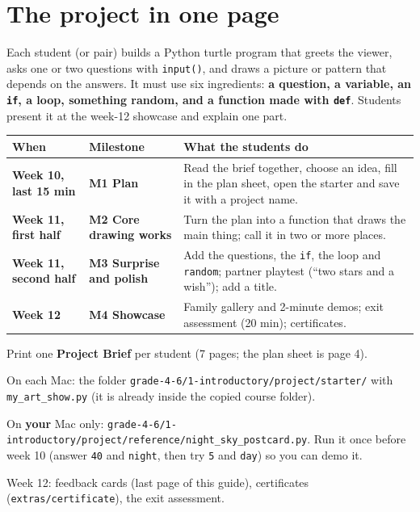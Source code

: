 \documentclass[level=1,teacher]{kidscode}
\begin{document}
\tableofcontents

\section{The project in one page}
Each student (or pair) builds a Python turtle program that greets the viewer, asks one or two
questions with \texttt{input()}, and draws a picture or pattern that depends on the answers.
It must use six ingredients: \textbf{a question, a variable, an \texttt{if}, a loop, something random,
and a function made with \texttt{def}}. Students present it at the week-12 showcase and explain one part.

\renewcommand{\arraystretch}{1.35}
\begin{tabularx}{\linewidth}{@{}>{\bfseries}p{2.4cm}>{\bfseries}p{3.4cm}X@{}}
\toprule
When & Milestone & What the students do\\
\midrule
Week 10, last 15 min & M1 Plan & Read the brief together, choose an idea, fill in the plan sheet, open the starter and save it with a project name.\\
Week 11, first half & M2 Core drawing works & Turn the plan into a function that draws the main thing; call it in two or more places.\\
Week 11, second half & M3 Surprise and polish & Add the questions, the \texttt{if}, the loop and \texttt{random}; partner playtest (\enquote{two stars and a wish}); add a title.\\
Week 12 & M4 Showcase & Family gallery and 2-minute demos; exit assessment (20 min); certificates.\\
\bottomrule
\end{tabularx}

\begin{materials}
  \item Print one \textbf{Project Brief} per student (7 pages; the plan sheet is page 4).
  \item On each Mac: the folder \texttt{grade-4-6/1-introductory/\allowbreak{}project/\allowbreak{}starter/\allowbreak{}} with \texttt{my\_art\_show.py}
        (it is already inside the copied course folder).
  \item On \textbf{your} Mac only: \texttt{grade-4-6/1-introductory/\allowbreak{}project/\allowbreak{}reference/\allowbreak{}night\_sky\_postcard.py}.
        Run it once before week 10 (answer \texttt{40} and \texttt{night}, then try \texttt{5} and \texttt{day}) so you can demo it.
  \item Week 12: feedback cards (last page of this guide), certificates (\texttt{extras/\allowbreak{}certificate}), the exit assessment.
\end{materials}
\end{document}
